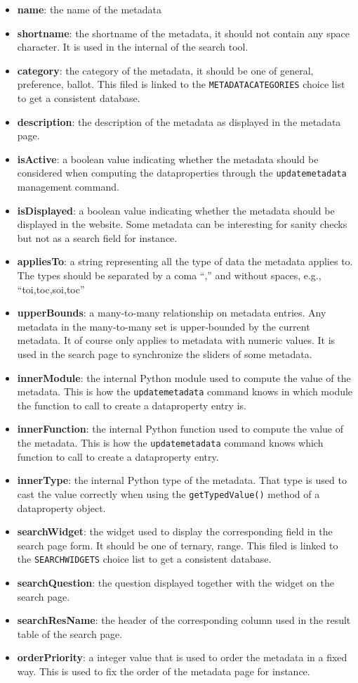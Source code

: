 \documentclass{report}
\begin{document}
	\begin{itemize}
		\item \textbf{name}: the name of the metadata
		\item \textbf{shortname}: the shortname of the metadata, it should not contain any space character. It is used in the internal of the search tool.
		\item \textbf{category}: the category of the metadata, it should be one of general, preference, ballot. This filed is linked to the \texttt{METADATACATEGORIES} choice list to get a consistent database.
		\item \textbf{description}: the description of the metadata as displayed in the metadata page.
		\item \textbf{isActive}: a boolean value indicating whether the metadata should be considered when computing the dataproperties through the \texttt{updatemetadata} management command.
		\item \textbf{isDisplayed}: a boolean value indicating whether the metadata should be displayed in the website. Some metadata can be interesting for sanity checks but not as a search field for instance.
		\item \textbf{appliesTo}: a string representing all the type of data the metadata applies to. The types should be separated by a coma ``,'' and without spaces, e.g., ``toi,toc,soi,toc''
		\item \textbf{upperBounds}: a many-to-many relationship on metadata entries. Any metadata in the many-to-many set is upper-bounded by the current metadata. It of course only applies to metadata with numeric values. It is used in the search page to synchronize the sliders of some metadata.
		\item \textbf{innerModule}: the internal Python module used to compute the value of the metadata. This is how the \texttt{updatemetadata} command knows in which module the function to call to create a dataproperty entry is.
		\item \textbf{innerFunction}: the internal Python function used to compute the value of the metadata. This is how the \texttt{updatemetadata} command knows which function to call to create a dataproperty entry.
		\item \textbf{innerType}: the internal Python type of the metadata. That type is used to cast the value correctly when using the \texttt{getTypedValue()} method of a dataproperty object.
		\item \textbf{searchWidget}: the widget used to display the corresponding field in the search page form. It should be one of ternary, range. This filed is linked to the \texttt{SEARCHWIDGETS} choice list to get a consistent database.
		\item \textbf{searchQuestion}: the question displayed together with the widget on the search page.
		\item \textbf{searchResName}: the header of the corresponding column used in the result table of the search page.
		\item \textbf{orderPriority}: a integer value that is used to order the metadata in a fixed way. This is used to fix the order of the metadata page for instance. 
	\end{itemize}
\end{document}
